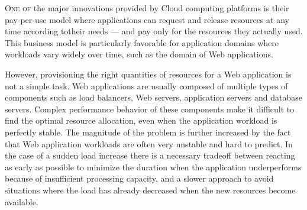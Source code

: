 


\lettrine{O}{ne of} the major innovations provided by Cloud computing
platforms is their pay-per-use model where applications can request
and release resources at any time according totheir needs --- and pay
only for the resources they actually used. This business model is
particularly favorable for application domains where workloads vary
widely over time, such as the domain of Web applications.

However, provisioning the right quantities of resources for a Web
application is not a simple task. Web applications are usually
composed of multiple types of components such as load balancers, Web
servers, application servers and database servers. Complex performance
behavior of these components make it difficult to find the optimal
resource allocation, even when the application workload is perfectly
stable. The magnitude of the problem is further increased by the fact
that Web application workloads are often very unstable and hard to
predict. In the case of a sudden load increase there is a necessary
tradeoff between reacting as early as possible to minimize the
duration when the application underperforms because of insufficient
processing capacity, and a slower approach to avoid situations where
the load has already decreased when the new resources become
available.

